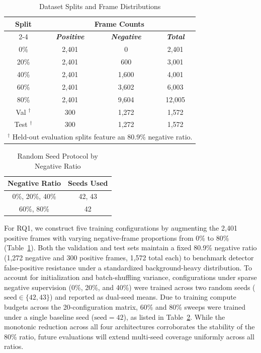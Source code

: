 \documentclass[conference]{IEEEtran}
\begin{document}
\begin{table}[htbp]
\caption{Dataset Splits and Frame Distributions}
\label{tab:splits}
\begin{center}
\begin{tabular}{|c|c|c|c|}
\hline
\textbf{Split} & \multicolumn{3}{|c|}{\textbf{Frame Counts}} \\
\cline{2-4}
& \textbf{\textit{Positive}} & \textbf{\textit{Negative}} & \textbf{\textit{Total}} \\
\hline
0\%                 & 2,401 & 0     & 2,401  \\
20\%                & 2,401 & 600   & 3,001  \\
40\%                & 2,401 & 1,600 & 4,001  \\
60\%                & 2,401 & 3,602 & 6,003  \\
80\%                & 2,401 & 9,604 & 12,005 \\
\hline
Val $^{\dagger}$    & 300   & 1,272 & 1,572  \\
Test $^{\dagger}$   & 300   & 1,272 & 1,572  \\
\hline
\multicolumn{4}{l}{$^{\dagger}$ Held-out evaluation splits feature an 80.9\% negative ratio.}
\end{tabular}
\end{center}
\end{table}

\begin{table}[htbp]
\caption{Random Seed Protocol by Negative Ratio}
\label{tab:seeds}
\begin{center}
\begin{tabular}{|c|c|}
\hline
\textbf{Negative Ratio} & \textbf{Seeds Used} \\
\hline
0\%, 20\%, 40\% & 42, 43 \\
60\%, 80\%      & 42 \\
\hline
\end{tabular}
\end{center}
\end{table}

For RQ1, we construct five training configurations by augmenting the 2,401 positive frames with varying negative-frame proportions from 0\% to 80\% (Table~\ref{tab:splits}). Both the validation and test sets maintain a fixed 80.9\% negative ratio (1,272 negative and 300 positive frames, 1,572 total each) to benchmark detector false-positive resistance under a standardized background-heavy distribution. To account for initialization and batch-shuffling variance, configurations under sparse negative supervision (0\%, 20\%, and 40\%) were trained across two random seeds ($\text{seed} \in \{42, 43\}$) and reported as dual-seed means. Due to training compute budgets across the 20-configuration matrix, 60\% and 80\% sweeps were trained under a single baseline seed ($\text{seed} = 42$), as listed in Table~\ref{tab:seeds}. While the monotonic reduction across all four architectures corroborates the stability of the 80\% ratio, future evaluations will extend multi-seed coverage uniformly across all ratios.
\end{document}
